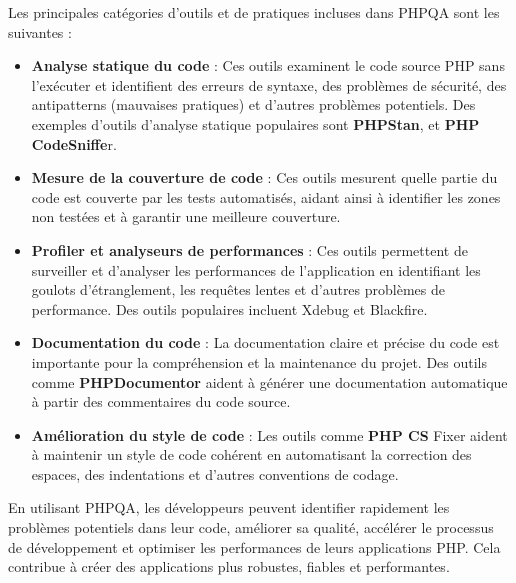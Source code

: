 		Les principales catégories d'outils et de pratiques incluses dans PHPQA sont les suivantes :
		\begin{itemize}
			\item \textbf{Analyse statique du code} : Ces outils examinent le code source PHP sans l'exécuter et identifient des erreurs de syntaxe, des problèmes de sécurité, des antipatterns (mauvaises pratiques) et d'autres problèmes potentiels. Des exemples d'outils d'analyse statique populaires sont \textbf{PHPStan}, et \textbf{PHP CodeSniffe}r.
			\item \textbf{Mesure de la couverture de code} : Ces outils mesurent quelle partie du code est couverte par les tests automatisés, aidant ainsi à identifier les zones non testées et à garantir une meilleure couverture.
			\item \textbf{Profiler et analyseurs de performances} : Ces outils permettent de surveiller et d'analyser les performances de l'application en identifiant les goulots d'étranglement, les requêtes lentes et d'autres problèmes de performance. Des outils populaires incluent Xdebug et Blackfire.
			\item \textbf{Documentation du code} : La documentation claire et précise du code est importante pour la compréhension et la maintenance du projet. Des outils comme \textbf{PHPDocumentor} aident à générer une documentation automatique à partir des commentaires du code source.
			\item \textbf{Amélioration du style de code} : Les outils comme \textbf{PHP CS} Fixer aident à maintenir un style de code cohérent en automatisant la correction des espaces, des indentations et d'autres conventions de codage.
		\end{itemize}
		
		En utilisant PHPQA, les développeurs peuvent identifier rapidement les problèmes potentiels dans leur code, améliorer sa qualité, accélérer le processus de développement et optimiser les performances de leurs applications PHP. Cela contribue à créer des applications plus robustes, fiables et performantes.
		
		
